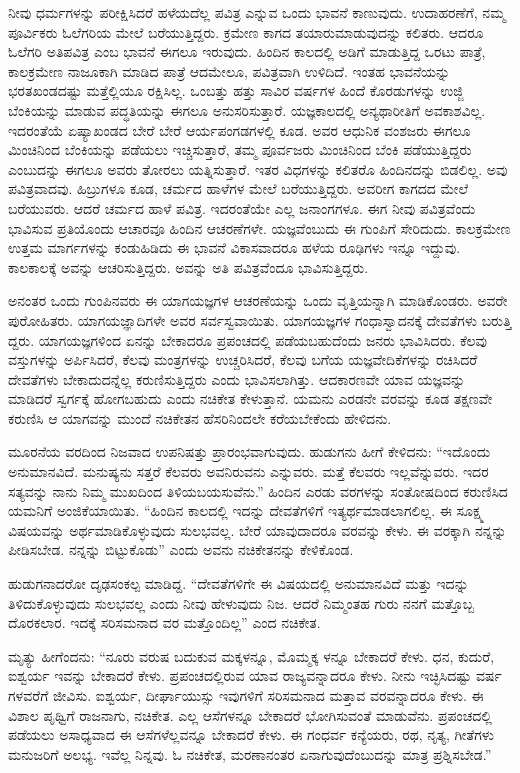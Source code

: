 ನೀವು ಧರ್ಮಗಳನ್ನು ಪರೀಕ್ಷಿಸಿದರೆ ಹಳೆಯದೆಲ್ಲ ಪವಿತ್ರ ಎನ್ನುವ ಒಂದು ಭಾವನೆ ಕಾಣುವುದು. ಉದಾಹರಣೆಗೆ, ನಮ್ಮ ಪೂರ್ವಿಕರು ಓಲೆಗರಿಯ ಮೇಲೆ ಬರೆಯುತ್ತಿದ್ದರು. ಕ್ರಮೇಣ ಕಾಗದ ತಯಾರುಮಾಡುವುದನ್ನು ಕಲಿತರು. ಆದರೂ ಓಲೆಗರಿ ಅತಿಪವಿತ್ರ ಎಂಬ ಭಾವನೆ ಈಗಲೂ ಇರುವುದು. ಹಿಂದಿನ ಕಾಲದಲ್ಲಿ ಅಡಿಗೆ ಮಾಡುತ್ತಿದ್ದ ಒರಟು ಪಾತ್ರೆ, ಕಾಲಕ್ರಮೇಣ ನಾಜೂಕಾಗಿ ಮಾಡಿದ ಪಾತ್ರೆ ಆದಮೇಲೂ, ಪವಿತ್ರವಾಗಿ ಉಳಿದಿದೆ. ಇಂತಹ ಭಾವನೆಯನ್ನು ಭರತಖಂಡದಷ್ಟು ಮತ್ತೆಲ್ಲಿಯೂ ರಕ್ಷಿಸಿಲ್ಲ. ಒಂಬತ್ತು ಹತ್ತು ಸಾವಿರ ವರ್ಷಗಳ ಹಿಂದೆ ಕೊರಡುಗಳನ್ನು ಉಜ್ಜಿ ಬೆಂಕಿಯನ್ನು ಮಾಡುವ ಪದ್ಧತಿಯನ್ನು ಈಗಲೂ ಅನುಸರಿಸುತ್ತಾರೆ. ಯಜ್ಞಕಾಲದಲ್ಲಿ ಅನ್ಯಥಾರೀತಿಗೆ ಅವಕಾಶವಿಲ್ಲ. ಇದರಂತೆಯೆ ಏಷ್ಯಾಖಂಡದ ಬೇರೆ ಬೇರೆ ಆರ್ಯಪಂಗಡಗಳಲ್ಲಿ ಕೂಡ. ಅವರ ಆಧುನಿಕ ವಂಶಜರು ಈಗಲೂ ಮಿಂಚಿನಿಂದ ಬೆಂಕಿಯನ್ನು ಪಡೆಯಲು ಇಚ್ಚಿಸುತ್ತಾರೆ, ತಮ್ಮ ಪೂರ್ವಜರು ಮಿಂಚಿನಿಂದ ಬೆಂಕಿ ಪಡೆಯುತ್ತಿದ್ದರು ಎಂಬುದನ್ನು ಈಗಲೂ ಅವರು ತೋರಲು ಯತ್ನಿಸುತ್ತಾರೆ. ಇತರ ವಿಧಗಳನ್ನು ಕಲಿತರೊ ಹಿಂದಿನದನ್ನು ಬಿಡಲಿಲ್ಲ. ಅವು ಪವಿತ್ರವಾದವು. ಹಿಬ್ರುಗಳೂ ಕೂಡ, ಚರ್ಮದ ಹಾಳೆಗಳ ಮೇಲೆ ಬರೆಯುತ್ತಿದ್ದರು. ಅವರೀಗ ಕಾಗದದ ಮೇಲೆ ಬರೆಯುವರು. ಆದರೆ ಚರ್ಮದ ಹಾಳೆ ಪವಿತ್ರ. ಇದರಂತೆಯೇ ಎಲ್ಲ ಜನಾಂಗಗಳೂ. ಈಗ ನೀವು ಪವಿತ್ರವೆಂದು ಭಾವಿಸುವ ಪ್ರತಿಯೊಂದು ಆಚಾರವೂ ಹಿಂದಿನ ಆಚರಣೆಗಳೇ. ಯಜ್ಞವೆಂಬುದು ಈ ಗುಂಪಿಗೆ ಸೇರಿದುದು. ಕಾಲಕ್ರಮೇಣ ಉತ್ತಮ ಮಾರ್ಗಗಳನ್ನು ಕಂಡುಹಿಡಿದು ಈ ಭಾವನೆ ವಿಕಾಸವಾದರೂ ಹಳೆಯ ರೂಢಿಗಳು ಇನ್ನೂ ಇದ್ದುವು. ಕಾಲಕಾಲಕ್ಕೆ ಅವನ್ನು ಆಚರಿಸುತ್ತಿದ್ದರು. ಅವನ್ನು ಅತಿ ಪವಿತ್ರವೆಂದೂ ಭಾವಿಸುತ್ತಿದ್ದರು.

ಅನಂತರ ಒಂದು ಗುಂಪಿನವರು ಈ ಯಾಗಯಜ್ಞಗಳ ಆಚರಣೆಯನ್ನು ಒಂದು ವೃತ್ತಿಯನ್ನಾಗಿ ಮಾಡಿಕೊಂಡರು. ಅವರೇ ಪುರೋಹಿತರು. ಯಾಗಯಜ್ಞಾದಿಗಳೇ ಅವರ ಸರ್ವಸ್ವವಾಯಿತು. ಯಾಗಯಜ್ಞಗಳ ಗಂಧಾಸ್ವಾದನಕ್ಕೆ ದೇವತೆಗಳು ಬರುತ್ತಿ ದ್ದರು. ಯಾಗಯಜ್ಞಗಳಿಂದ ಏನನ್ನು ಬೇಕಾದರೂ ಪ್ರಪಂಚದಲ್ಲಿ ಪಡೆಯಬಹುದೆಂದು ಜನರು ಭಾವಿಸಿದರು. ಕೆಲವು ವಸ್ತುಗಳನ್ನು ಅರ್ಪಿಸಿದರೆ, ಕೆಲವು ಮಂತ್ರಗಳನ್ನು ಉಚ್ಚರಿಸಿದರೆ, ಕೆಲವು ಬಗೆಯ ಯಜ್ಞವೇದಿಕೆಗಳನ್ನು ರಚಿಸಿದರೆ ದೇವತೆಗಳು ಬೇಕಾದುದನ್ನೆಲ್ಲ ಕರುಣಿಸುತ್ತಿದ್ದರು ಎಂದು ಭಾವಿಸಲಾಗಿತ್ತು. ಆದಕಾರಣವೇ ಯಾವ ಯಜ್ಞವನ್ನು ಮಾಡಿದರೆ ಸ್ವರ್ಗಕ್ಕೆ ಹೋಗಬಹುದು ಎಂದು ನಚಿಕೇತ ಕೇಳುತ್ತಾನೆ. ಯಮನು ಎರಡನೇ ವರವನ್ನು ಕೂಡ ತಕ್ಷಣವೇ ಕರುಣಿಸಿ ಆ ಯಾಗವನ್ನು ಮುಂದೆ ನಚಿಕೇತನ ಹೆಸರಿನಿಂದಲೇ ಕರೆಯಬೇಕೆಂದು ಹೇಳಿದನು.

ಮೂರನೆಯ ವರದಿಂದ ನಿಜವಾದ ಉಪನಿಷತ್ತು ಪ್ರಾರಂಭವಾಗುವುದು. ಹುಡುಗನು ಹೀಗೆ ಕೇಳಿದನು: “ಇದೊಂದು ಅನುಮಾನವಿದೆ. ಮನುಷ್ಯನು ಸತ್ತರೆ ಕೆಲವರು ಅವನಿರುವನು ಎನ್ನುವರು. ಮತ್ತೆ ಕೆಲವರು ಇಲ್ಲವೆನ್ನುವರು. ಇದರ ಸತ್ಯವನ್ನು ನಾನು ನಿಮ್ಮ ಮುಖದಿಂದ ತಿಳಿಯಬಯಸುವೆನು.” ಹಿಂದಿನ ಎರಡು ವರಗಳನ್ನು ಸಂತೋಷದಿಂದ ಕರುಣಿಸಿದ ಯಮನಿಗೆ ಅಂಜಿಕೆಯಾಯಿತು. “ಹಿಂದಿನ ಕಾಲದಲ್ಲಿ ಇದನ್ನು ದೇವತೆಗಳಿಗೆ ಇತ್ಯರ್ಥಮಾಡಲಾಗಲಿಲ್ಲ. ಈ ಸೂಕ್ಷ್ಮ ವಿಷಯವನ್ನು ಅರ್ಥಮಾಡಿಕೊಳ್ಳುವುದು ಸುಲಭವಲ್ಲ. ಬೇರೆ ಯಾವುದಾದರೂ ವರವನ್ನು ಕೇಳು. ಈ ವರಕ್ಕಾಗಿ ನನ್ನನ್ನು ಪೀಡಿಸಬೇಡ. ನನ್ನನ್ನು ಬಿಟ್ಟುಕೊಡು” ಎಂದು ಅವನು ನಚಿಕೇತನನ್ನು ಕೇಳಿಕೊಂಡ.

ಹುಡುಗನಾದರೋ ದೃಢಸಂಕಲ್ಪ ಮಾಡಿದ್ದ. “ದೇವತೆಗಳಿಗೇ ಈ ವಿಷಯದಲ್ಲಿ ಅನುಮಾನವಿದೆ ಮತ್ತು ಇದನ್ನು ತಿಳಿದುಕೊಳ್ಳುವುದು ಸುಲಭವಲ್ಲ ಎಂದು ನೀವು ಹೇಳುವುದು ನಿಜ. ಆದರೆ ನಿಮ್ಮಂತಹ ಗುರು ನನಗೆ ಮತ್ತೊಬ್ಬ ದೊರಕಲಾರ. ಇದಕ್ಕೆ ಸರಿಸಮನಾದ ವರ ಮತ್ತೊಂದಿಲ್ಲ” ಎಂದ ನಚಿಕೇತ.

ಮೃತ್ಯು ಹೀಗೆಂದನು: “ನೂರು ವರುಷ ಬದುಕುವ ಮಕ್ಕಳನ್ನೂ, ಮೊಮ್ಮಕ್ಕ ಳನ್ನೂ ಬೇಕಾದರೆ ಕೇಳು. ಧನ, ಕುದುರೆ, ಐಶ್ವರ್ಯ ಇವನ್ನು ಬೇಕಾದರೆ ಕೇಳು. ಪ್ರಪಂಚದಲ್ಲಿರುವ ಯಾವ ರಾಜ್ಯವನ್ನಾದರೂ ಕೇಳು. ನೀನು ಇಚ್ಛಿಸಿದಷ್ಟು ವರ್ಷ ಗಳವರೆಗೆ ಜೀವಿಸು. ಐಶ್ವರ್ಯ, ದೀರ್ಘಾಯುಸ್ಸು ಇವುಗಳಿಗೆ ಸರಿಸಮನಾದ ಮತ್ತಾವ ವರವನ್ನಾದರೂ ಕೇಳು. ಈ ವಿಶಾಲ ಪೃಥ್ವಿಗೆ ರಾಜನಾಗು, ನಚಿಕೇತ. ಎಲ್ಲ ಆಸೆಗಳನ್ನೂ ಬೇಕಾದರೆ ಭೋಗಿಸುವಂತೆ ಮಾಡುವೆನು. ಪ್ರಪಂಚದಲ್ಲಿ ಪಡೆಯಲು ಅಸಾಧ್ಯವಾದ ಈ ಆಸೆಗಳೆಲ್ಲವನ್ನೂ ಬೇಕಾದರೆ ಕೇಳು. ಈ ಗಂಧರ್ವ ಕನ್ಯೆಯರು, ರಥ, ನೃತ್ಯ, ಗೀತೆಗಳು ಮನುಜರಿಗೆ ಅಲಭ್ಯ. ಇವೆಲ್ಲ ನಿನ್ನವು. ಓ ನಚಿಕೇತ, ಮರಣಾನಂತರ ಏನಾಗುವುದೆಂಬುದನ್ನು ಮಾತ್ರ ಪ್ರಶ್ನಿಸಬೇಡ.”

